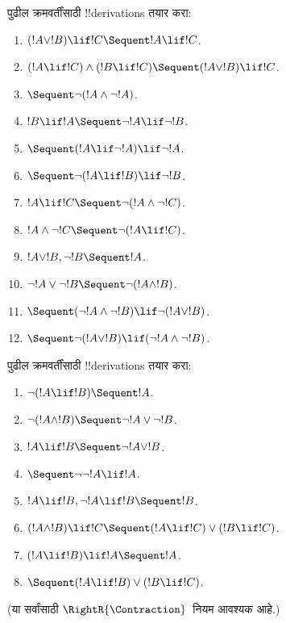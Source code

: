 \documentclass[../../../include/open-logic-section]{subfiles}
\begin{document}
\begin{prob}
पुढील क्रमवर्तींसाठी !!{derivation}s तयार करा:
\begin{enumerate}
\item $(!A \lor !B) \lif !C \Sequent !A \lif !C$.
\item $(!A \lif !C) \land (!B \lif !C) \Sequent (!A \lor !B) \lif !C$.
\item $\Sequent \lnot(!A \land \lnot !A)$.
\item $!B \lif !A \Sequent \lnot !A \lif \lnot !B$.
\item $\Sequent (!A \lif \lnot !A) \lif \lnot !A$.
\item $\Sequent \lnot(!A \lif !B) \lif \lnot !B$.
\item $!A \lif !C \Sequent \lnot (!A \land \lnot !C)$.
\item $!A \land \lnot !C \Sequent \lnot (!A \lif !C)$.
\item $!A \lor !B, \lnot !B \Sequent !A$.
\item $\lnot !A \lor \lnot !B \Sequent \lnot(!A \land !B)$.
\item $\Sequent (\lnot !A \land \lnot !B) \lif\lnot(!A \lor !B)$.
\item $\Sequent \lnot(!A \lor !B) \lif (\lnot !A \land \lnot !B)$.
\end{enumerate}
\end{prob}

\begin{prob}
पुढील क्रमवर्तींसाठी !!{derivation}s तयार करा:
\begin{enumerate}
\item $\lnot(!A \lif !B) \Sequent !A$.
\item $\lnot(!A \land !B) \Sequent \lnot !A \lor \lnot !B$.
\item $!A \lif !B \Sequent \lnot !A \lor !B$.
\item $\Sequent \lnot \lnot !A \lif !A$.
\item $!A \lif !B, \lnot !A \lif !B \Sequent !B$.
\item $(!A \land !B) \lif !C \Sequent (!A \lif !C) \lor (!B \lif !C)$.
\item $(!A \lif !B) \lif !A \Sequent !A$.
\item $\Sequent (!A \lif !B) \lor (!B \lif !C)$.
\end{enumerate}
(या सर्वांसाठी $\RightR{\Contraction}$~नियम आवश्यक आहे.)
\end{prob}
\end{document}
